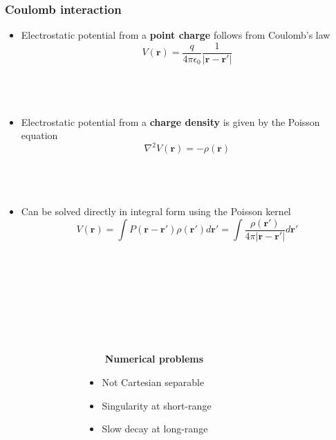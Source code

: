 \documentclass[mathserif, 8pt]{beamer}
\begin{document}
\begin{frame}
    \frametitle{Coulomb interaction}
    \begin{itemize}
	\item	Electrostatic potential from a \textbf{point charge} follows from Coulomb's law
		\begin{equation}
		    \nonumber
		    V(\boldsymbol{r}) = \frac{q}{4\pi\epsilon_0}
		    \frac{1}{|\boldsymbol{r}-\boldsymbol{r}'|}
		\end{equation}
		\ \\
		\ \\
		\ \\
	\item	Electrostatic potential from a \textbf{charge density} is given by the Poisson equation
		\begin{equation}
		    \nonumber
		    \nabla^2 V(\boldsymbol{r}) = -\rho(\boldsymbol{r})
		\end{equation}
		\ \\
		\ \\
		\ \\
	\item	Can be solved directly in integral form using the Poisson kernel
		\begin{equation}
		    \nonumber
		    V(\boldsymbol{r}) = 
		    \int P(\boldsymbol{r}-\boldsymbol{r'})\rho(\boldsymbol{r'}) d\boldsymbol{r'} =
		    \int\frac{\rho(\boldsymbol{r'})}{4\pi|\boldsymbol{r} - \boldsymbol{r'}|} d\boldsymbol{r'} 
		\end{equation}
		\ \\
		\ \\
		\ \\
    \end{itemize}
    \ \\
    \ \\
    \ \\
    \begin{columns}
    \begin{column}{.30\textwidth}
        \ \\
    \end{column}
    \begin{column}{.40\textwidth}
        \ \ \ \ \textbf{Numerical problems}
        \begin{itemize}
	    \item Not Cartesian separable
	    \item Singularity at short-range
	    \item Slow decay at long-range
	\end{itemize}
    \end{column}
    \begin{column}{.30\textwidth}
	\ \\
    \end{column}
    \end{columns}
\end{frame}
\end{document}
